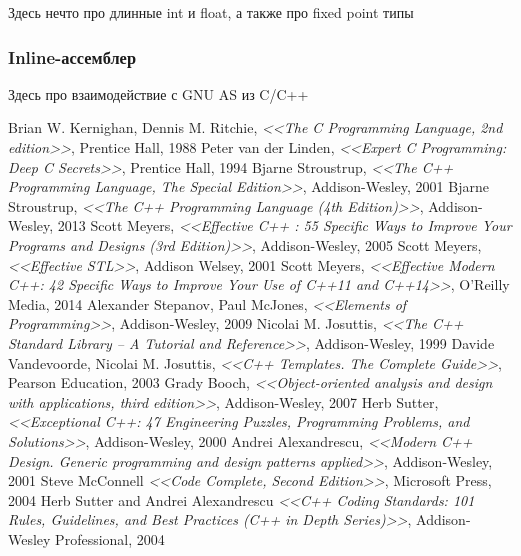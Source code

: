 \documentclass[a4paper,12pt,oneside]{article}
\begin{document}
Здесь нечто про длинные int и float, а также про fixed point типы

\subsubsection{Inline-ассемблер}

Здесь про взаимодействие с GNU AS из C/C++

\pagebreak
{}
\listoffigures

\pagebreak
{}
\begin{thebibliography}{99}
 Brian W. Kernighan, Dennis M. Ritchie, \textit{<<The C Programming Language, 2nd edition>>}, Prentice Hall, 1988
 Peter van der Linden, \textit{<<Expert C Programming: Deep C Secrets>>}, Prentice Hall, 1994
 Bjarne Stroustrup, \textit{<<The C++ Programming Language, The Special Edition>>}, Addison-Wesley, 2001
 Bjarne Stroustrup, \textit{<<The C++ Programming Language (4th Edition)>>}, Addison-Wesley, 2013
 Scott Meyers, \textit{<<Effective C++ : 55 Specific Ways to Improve Your Programs and Designs (3rd Edition)>>}, Addison-Wesley, 2005
 Scott Meyers, \textit{<<Effective STL>>}, Addison Welsey, 2001
 Scott Meyers, \textit{<<Effective Modern C++: 42 Specific Ways to Improve Your Use of C++11 and C++14>>}, O'Reilly Media, 2014
 Alexander Stepanov, Paul McJones, \textit{<<Elements of Programming>>}, Addison-Wesley, 2009
 Nicolai M. Josuttis, \textit{<<The C++ Standard Library -- A Tutorial and Reference>>}, Addison-Wesley, 1999
 Davide Vandevoorde, Nicolai M. Josuttis, \textit{<<C++ Templates. The Complete Guide>>}, Pearson Education, 2003
 Grady Booch, \textit{<<Object-oriented analysis and design with applications, third edition>>}, Addison-Wesley, 2007
 Herb Sutter, \textit{<<Exceptional C++: 47 Engineering Puzzles, Programming Problems, and Solutions>>}, Addison-Wesley, 2000
 Andrei Alexandrescu, \textit{<<Modern C++ Design. Generic programming and design patterns applied>>}, Addison-Wesley, 2001
 Steve McConnell \textit{<<Code Complete, Second Edition>>}, Microsoft Press, 2004
 Herb Sutter and Andrei Alexandrescu \textit{<<C++ Coding Standards: 101 Rules, Guidelines, and Best Practices (C++ in Depth Series)>>}, Addison-Wesley Professional, 2004

\end{thebibliography}
\end{document}
